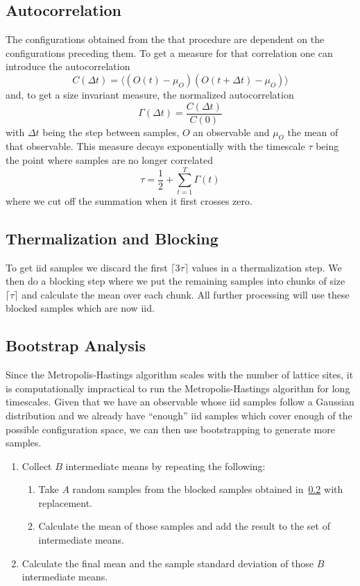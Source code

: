 \subsection{Autocorrelation}
The configurations obtained from the that procedure are dependent on the configurations preceding them.  To get a measure for that correlation one can introduce the autocorrelation
\begin{equation}
	C(\Delta t) = \langle(O(t) - \mu_O)(O(t + \Delta t) - \mu_O) \rangle
\end{equation}
and, to get a size invariant measure, the normalized autocorrelation
\begin{equation}
	\Gamma(\Delta t) = \frac{C(\Delta t)}{C(0)}
\end{equation}
with $\Delta t$ being the step between samples, $O$ an observable and $\mu_O$ the mean of that observable. This measure decays exponentially with the timescale $\tau$ being the point where samples are no longer correlated
\begin{equation}
	\tau = \frac{1}{2} + \sum^{T}_{t=1}{\Gamma(t)}
\end{equation}
where we cut off the summation when it first crosses zero.

\subsection{Thermalization and Blocking}\label{sec:blocking}
To get iid samples we discard the first $\lceil 3\tau \rceil$ values in a thermalization step. We then do a blocking step where we put the remaining samples into chunks of size $\lceil \tau \rceil$ and calculate the mean over each chunk. All further processing will use these blocked samples which are now iid.

\subsection{Bootstrap Analysis}\label{sec:bootstrap}
Since the Metropolis-Hastings algorithm scales with the number of lattice sites, it is computationally impractical to run the Metropolis-Hastings algorithm for long timescales. Given that we have an observable whose iid samples follow a Gaussian distribution and we already have \enquote{enough} iid samples which cover enough of the possible configuration space, we can then use bootstrapping to generate more samples.
\begin{enumerate}
	\item Collect $B$ intermediate means by repeating the following:
	\begin{enumerate}
		\item Take $A$ random samples from the blocked samples obtained in~\cref{sec:blocking} with replacement.
		\item Calculate the mean of those samples and add the result to the set of intermediate means.
	\end{enumerate}
	\item Calculate the final mean and the sample standard deviation of those $B$ intermediate means.
\end{enumerate}

